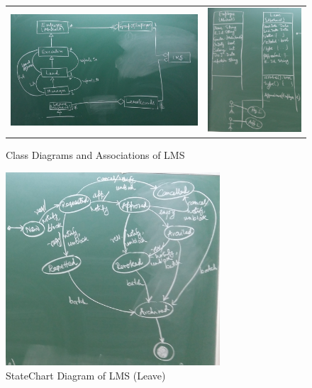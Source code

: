 \documentclass{article}
\begin{document}
\begin{figure}[ht]
\centering
\begin{tabular}{ll}
\includegraphics[width=12cm]{Images/Class_2.jpg} &
\includegraphics[width=6cm]{Images/Class_3.jpg}
\end{tabular}
\caption{Class Diagrams and Associations of LMS
\label{fig:use-case}
}
\end{figure}

\begin{figure}[!ht]
\centering
\includegraphics[width=8cm]{Images/StateChart.jpg}
\caption{StateChart Diagram of LMS (Leave)
\label{fig:use-case}
}
\end{figure}
\end{document}
